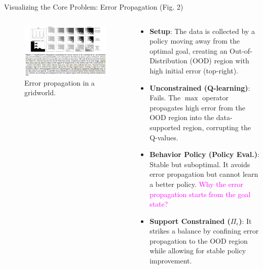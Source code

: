\documentclass[11pt]{beamer}
\newcommand{\tb}[1]{\textbf{#1}}
\begin{document}
\begin{frame}{Visualizing the Core Problem: Error Propagation (Fig. 2)}
    \begin{columns}[T] %
        
        \begin{column}{0.5\textwidth}
            \begin{figure}
                \centering
                \includegraphics[width=\textwidth]{Figure2.png}
                \caption{Error propagation in a gridworld.}
            \end{figure}
        \end{column}
        
        \begin{column}{0.5\textwidth}
            \begin{itemize}
                \item \tb{Setup}: The data is collected by a policy moving away from the optimal goal, creating an Out-of-Distribution (OOD) region with high initial error (top-right).
                \vspace{1em}
                \item \tb{Unconstrained (Q-learning)}: Fails. The $\max$ operator propagates high error from the OOD region into the data-supported region, corrupting the Q-values.
                \vspace{1em}
                \item \tb{Behavior Policy (Policy Eval.)}: Stable but suboptimal. It avoids error propagation but cannot learn a better policy.
                \textcolor{magenta}{Why the error propagation starts from the goal state?}
                \vspace{1em}
                \item \tb{Support Constrained ($\Pi_\epsilon$)}: It strikes a balance by confining error propagation to the OOD region while allowing for stable policy improvement.
            \end{itemize}
        \end{column}
        
    \end{columns}
\end{frame}
\end{document}
